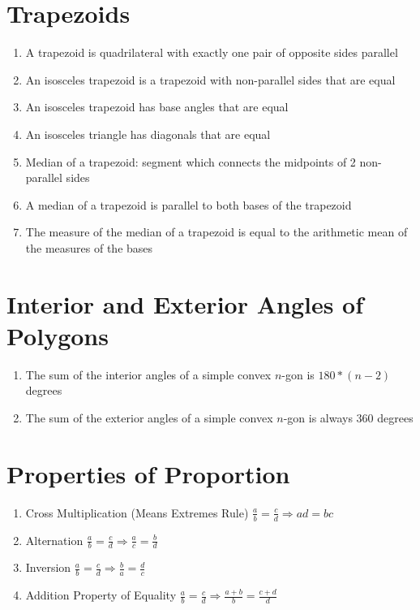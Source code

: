 \section*{Trapezoids}
\begin{enumerate}
    \item A trapezoid is quadrilateral with exactly one pair of opposite sides parallel
    \item An isosceles trapezoid is a trapezoid with non-parallel sides that are equal
    \item An isosceles trapezoid has base angles that are equal
    \item An isosceles triangle has diagonals that are equal
    \item Median of a trapezoid: segment which connects the midpoints of 2 non-parallel sides
    \item A median of a trapezoid is parallel to both bases of the trapezoid
    \item The measure of the median of a trapezoid is equal to the arithmetic mean of the measures of the bases
\end{enumerate}

\section*{Interior and Exterior Angles of Polygons}
\begin{enumerate}
    \item The sum of the interior angles of a simple convex $n$-gon is $180*(n-2)$ degrees
    \item The sum of the exterior angles of a simple convex $n$-gon is always 360 degrees
\end{enumerate}

\section*{Properties of Proportion}
\begin{enumerate}
    \item Cross Multiplication (Means Extremes Rule) $\frac{a}{b}=\frac{c}{d}\Rightarrow ad=bc$
    \item Alternation $\frac{a}{b}=\frac{c}{d}\Rightarrow\frac{a}{c}=\frac{b}{d}$
    \item Inversion $\frac{a}{b}=\frac{c}{d}\Rightarrow\frac{b}{a}=\frac{d}{c}$
    \item Addition Property of Equality $\frac{a}{b}=\frac{c}{d}\Rightarrow\frac{a + b}{b}=\frac{c + d}{d}$
\end{enumerate}

